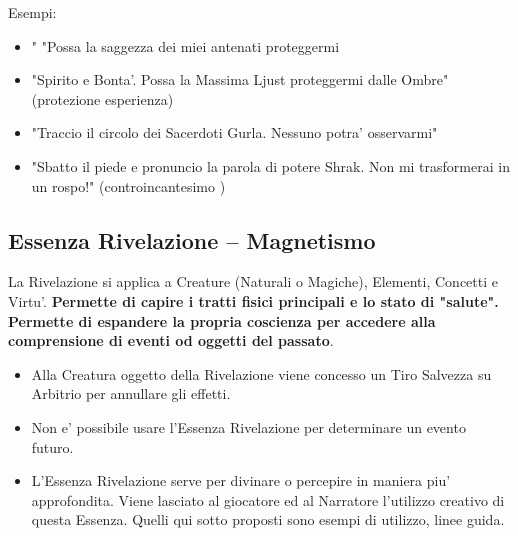 \documentclass[a4paper,11pt,twoside,openany]{book}
\begin{document}
\bigskip


Esempi:
\begin{itemize}
\item "
"Possa la saggezza dei miei antenati proteggermi 
\item 
"Spirito e Bonta'. Possa la Massima Ljust proteggermi dalle Ombre" (protezione esperienza) 
\item 
"Traccio il circolo dei Sacerdoti Gurla. Nessuno potra' osservarmi" 
\item 
"Sbatto il piede e pronuncio la parola di potere Shrak. Non mi trasformerai in un rospo!" (controincantesimo )
\end{itemize}

\pagebreak

\subsection{Essenza Rivelazione -- Magnetismo}

\label{essenza-rivelazione---magnetismo}

La Rivelazione si applica a Creature (Naturali o Magiche), Elementi, Concetti e Virtu'. \textbf{Permette di capire i tratti fisici principali e lo stato di "salute". Permette di espandere la propria coscienza per accedere alla comprensione di eventi od oggetti del passato}.
\begin{itemize}
\item 
Alla Creatura oggetto della Rivelazione viene concesso un Tiro Salvezza
su Arbitrio per annullare gli effetti. 
\item 
Non e' possibile usare l'Essenza Rivelazione per determinare un evento futuro. 
\item 
L'Essenza Rivelazione serve per divinare o percepire in maniera piu' approfondita. Viene lasciato al giocatore ed al Narratore l'utilizzo creativo di questa Essenza. Quelli qui sotto proposti sono esempi di utilizzo, linee guida. 
\end{itemize}

\bigskip
\end{document}

